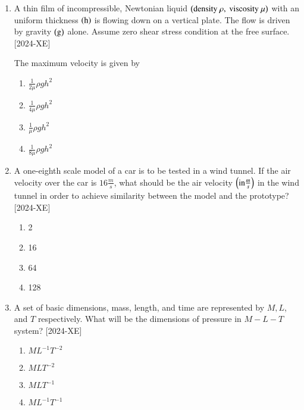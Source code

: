 \documentclass[journal]{IEEEtran}
\begin{document}
\begin{enumerate}[start=27]
\item A thin film of incompressible, Newtonian liquid $\left(\text{density } \rho, \text{ viscosity } \mu\right)$ with an uniform thickness $\left(\text{h}\right)$ is flowing down on a vertical plate. The flow is driven by gravity $\left(\text{g}\right)$ alone. Assume zero shear stress condition at the free surface. \hfill{[2024-XE]}\\

\begin{figure}[H]
    \centering
    
    \label{31}
\end{figure}

The maximum velocity is given by\\
\begin{enumerate}
    \item $\frac{1}{2\mu}\rho g h^2$\\
    \item $\frac{1}{4\mu}\rho g h^2$\\
    \item $\frac{1}{\mu}\rho g h^2$\\
    \item $\frac{1}{8\mu}\rho g h^2$\\
\end{enumerate}

\item A one-eighth scale model of a car is to be tested in a wind tunnel. If the air velocity over the car is $16 \frac{m}{s}$, what should be the air velocity $\left(\text{in} \frac{m}{s}\right)$ in the wind tunnel in order to achieve similarity between the model and the prototype? \hfill{[2024-XE]}\\
\begin{enumerate}
    \item 2\\
    \item 16\\
    \item 64\\
    \item 128\\
\end{enumerate}

\item A set of basic dimensions, mass, length, and time are represented by $M, L$, and $T$ respectively. What will be the dimensions of pressure in $M-L-T$ system? \hfill{[2024-XE]}\\
\begin{enumerate}
    \item $ML^{-1}T^{-2}$\\
    \item $MLT^{-2}$\\
    \item $MLT^{-1}$\\
    \item $ML^{-1}T^{-1}$\\
\end{enumerate}


\end{enumerate}
\end{document}
